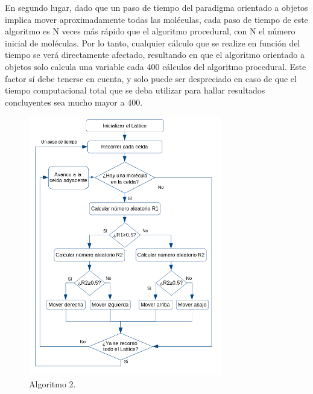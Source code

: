\documentclass[12pt,twocolumn]{article}
\begin{document}
En segundo lugar, dado que un paso de tiempo del paradigma orientado a objetos implica 
mover aproximadamente todas las moléculas, cada paso de tiempo de este algoritmo es N veces 
más rápido que el algoritmo procedural, con N el número inicial de moléculas. Por lo tanto, 
cualquier cálculo que se realize en función del tiempo se verá directamente afectado, 
resultando en que el algoritmo orientado a objetos solo calcula una variable cada 400 
cálculos del algoritmo procedural. Este factor sí debe tenerse en cuenta, y solo puede 
ser despreciado en caso de que el tiempo computacional total que se deba utilizar para 
hallar resultados concluyentes sea mucho mayor a 400.
\\
\begin{figure}
    \centering
    \includegraphics[width=0.75\textwidth]{figs/Algoritmo_OOP.png}
    \caption{Algoritmo 2.}
    \label{fig:algoritmo_OOP}
\end{figure}
\end{document}
